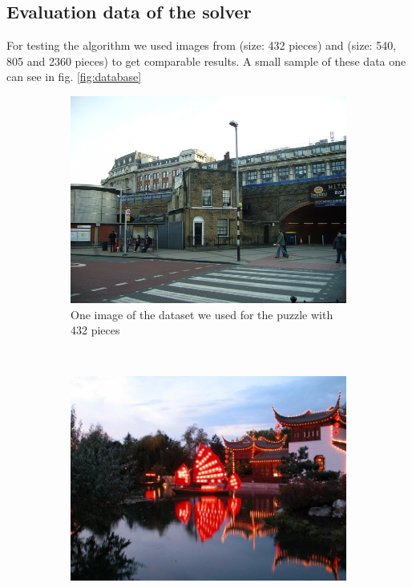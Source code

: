 \documentclass[11pt]{report}
\begin{document}
\subsection{Evaluation data of the solver}
For testing the algorithm we used images from \cite{Cho2010} (size: 432 pieces) and \cite{Pomeranz2011} (size: 540, 805 and 2360 pieces) to get comparable results. A small sample of these data one can see in fig. \ref{fig:database}

\begin{figure}
	\centering
	\begin{subfigure}[b]{0.45\textwidth}
		\includegraphics[width=\textwidth]{../imData/432/1.png}
		\caption{One image of the dataset we used for the puzzle with 432 pieces}
		\label{img:432}
	\end{subfigure}
	~
	\begin{subfigure}[b]{0.45\textwidth}
		\includegraphics[width=\textwidth]{../imData/540/1.jpg}

\end{subfigure}
\end{figure}
\end{document}
